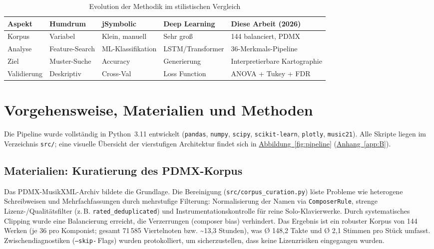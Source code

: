 \documentclass[10pt,a4paper]{article}
\theoremstyle{definition}
\begin{document}
\begin{table}[H]
    \centering
    \caption{Evolution der Methodik im stilistischen Vergleich}\label{tab:evolution}
    \begin{tabular}{p{2.2cm}p{2.5cm}p{2.5cm}p{3.5cm}p{4.5cm}}
        \toprule
        \textbf{Aspekt} & \textbf{Humdrum} & \textbf{jSymbolic} & \textbf{Deep Learning} & \textbf{Diese Arbeit (2026)} \\
        \midrule
        Korpus & Variabel & Klein, manuell & Sehr groß & 144 balanciert, PDMX \\
        Analyse & Feature-Search & ML-Klassifikation & LSTM/Transformer & 36-Merkmals-Pipeline \\
        Ziel & Muster-Suche & Accuracy & Generierung & Interpretierbare Kartographie \\
        Validierung & Deskriptiv & Cross-Val & Loss Function & ANOVA + Tukey + FDR \\
        \bottomrule
    \end{tabular}
\end{table}

\section{Vorgehensweise, Materialien und Methoden}
Die Pipeline wurde vollständig in Python~3.11 entwickelt (\texttt{pandas}, \texttt{numpy}, \texttt{scipy}, \texttt{scikit-learn}, \texttt{plotly}, \texttt{music21}). Alle Skripte liegen im Verzeichnis \texttt{src/}; eine visuelle Übersicht der vierstufigen Architektur findet sich in \hyperref[fig:pipeline]{Abbildung~\ref*{fig:pipeline}} (\hyperref[app:B]{Anhang~\ref*{app:B}}).

\subsection{Materialien: Kuratierung des PDMX-Korpus}
Das PDMX-MusikXML-Archiv\autocite{PDMX2024} bildete die Grundlage. Die Bereinigung (\texttt{src/corpus\_curation.py}) löste Probleme wie heterogene Schreibweisen und Mehrfachfassungen durch mehrstufige Filterung: Normalisierung der Namen via \texttt{ComposerRule}, strenge Lizenz-/Qualitätsfilter (z.\,B. \texttt{rated\_deduplicated}) und Instrumentationskontrolle für reine Solo-Klavierwerke. Durch systematisches Clipping wurde eine Balancierung erreicht, die Verzerrungen (composer bias) verhindert. Das Ergebnis ist ein robuster Korpus von 144 Werken (je 36 pro Komponist; gesamt 71\,585 Viertelnoten bzw. \textasciitilde 13,3 Stunden), was Ø 148,2 Takte und Ø 2,1 Stimmen pro Stück umfasst. Zwischendiagnostiken (\texttt{--skip-}\,Flags) wurden protokolliert, um sicherzustellen, dass keine Lizenzrisiken eingegangen wurden.
\end{document}
